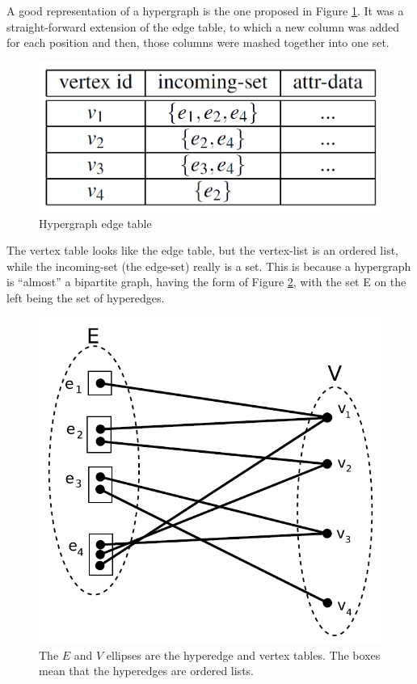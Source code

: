 A good representation of a hypergraph is the one proposed in Figure \ref{fig:atomspace_table}. 
It was a straight-forward extension of the edge table, to which a new column was added for each position and then, those columns were mashed together into one set.  

\begin{figure} [h]
\centering
\includegraphics[width=0.7
\textwidth]{figures/Magistrale/atomspace_table}
\caption[Hypergraph edge table]{Hypergraph edge table
\label{fig:atomspace_table}}
\end{figure}

The vertex table looks like the edge table, but the vertex-list is an ordered list, while the incoming-set (the edge-set) really is a set. This is because a hypergraph is “almost” a bipartite graph, having the form of Figure \ref{fig:hypergraph_graph}, with the set E on the left being the set of hyperedges. \\

\begin{figure} [h]
\centering
\includegraphics[width=0.6
\textwidth]{figures/Magistrale/hypergraph_graph}
\caption[Hypergraph as bipartite graph]{The $E$ and $V$ ellipses are the hyperedge and vertex tables. The boxes mean that the hyperedges are ordered lists.
\label{fig:hypergraph_graph}}
\end{figure}

